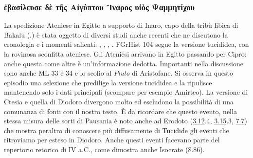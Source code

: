 {            \subsubsection{\textgreek{ἐβασίλευσε δὲ τῆς Αἰγύπτου Ἴναρος υἱὸς Ψαμμητίχου}} \label{bkm:RefHeading3376319231068}
            La spedizione Ateniese in Egitto a supporto di Inaro, capo della tribù libica di Bakalu (\cite[135–42]{Winnicki2006}.) è stata oggetto di diversi studi anche recenti che ne discutono la cronologia e i momenti salienti: \cite{Kahn2008}, \cite{Green2006}, \cite[129-131 (testo) e 266-7 (note)]{Lenfant2004}, \cite[591-4]{Briant1996}. FGrHist 104 segue la versione tucididea, con la rovinosa sconfitta ateniese. Gli Ateniesi arrivano in Egitto passando per Cipro: anche questa come altre è un'informazione dedotta. Importanti nella discussione sono anche ML 33 e 34 e lo scolio al \emph{Pluto} di Aristofane. Si osserva in questo episodio una selezione che predilige la versione tucididea e la ripulisce mantenendo solo i dati principali (scompare per esempio Amirteo). La versione di Ctesia e quella di  Diodoro divergono molto ed escludono la possibilità di una comunanza di fonti con il nostro testo. È da ricordare che questo evento, nella stessa misura delle sorti di Pausania  è noto anche ad Erodoto (\href{http://data.perseus.org/citations/urn:cts:greekLit:tlg0016.tlg001.perseus-grc1:3.12}{3.12}.4, \href{http://data.perseus.org/citations/urn:cts:greekLit:tlg0016.tlg001.perseus-grc1:3.15}{3.15}.3, \href{http://data.perseus.org/citations/urn:cts:greekLit:tlg0016.tlg001.perseus-grc1:7.7}{7.7}) che mostra peraltro di conoscere più diffusamente di Tucidide gli eventi che ritroviamo per esteso in Diodoro. Anche questi eventi facevano parte del repertorio retorico di IV a.C., come dimostra anche Isocrate (8.86).
}
